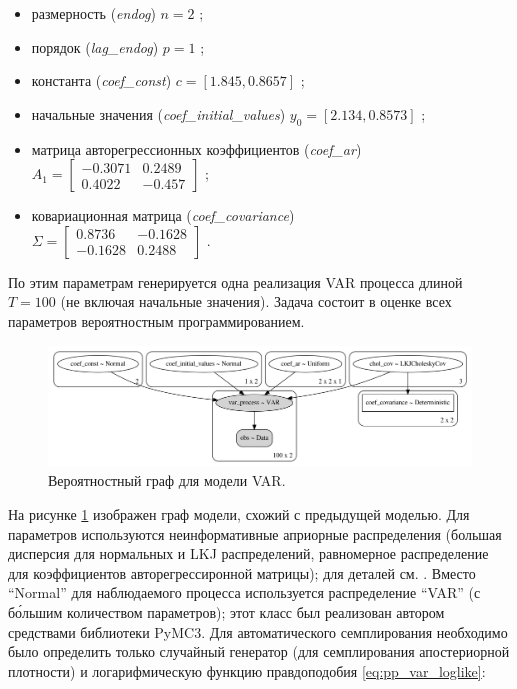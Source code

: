 \documentclass[a4paper,14pt]{extreport}
\begin{document}
\begin{itemize}
	\item размерность (\textit{endog}) $n=2$ ;
	\item порядок (\textit{lag\_endog}) $p=1$ ;
	\item константа (\textit{coef\_const}) $c=[1.845, 0.8657]$ ;
	\item начальные значения (\textit{coef\_initial\_values}) $y_0=[2.134, 0.8573]$ ;
	\item матрица авторегрессионных коэффициентов (\textit{coef\_ar}) \\ $ A_1 = \begin{bmatrix} -0.3071 & 0.2489 \\ 0.4022 & -0.457 \end{bmatrix} $ ;
	\item ковариационная матрица (\textit{coef\_covariance}) \\ $ \Sigma = \begin{bmatrix} 0.8736 & -0.1628 \\ -0.1628 & 0.2488 \end{bmatrix} $ .
\end{itemize}

По этим параметрам генерируется одна реализация VAR процесса длиной $T=100$ (не включая начальные значения). Задача состоит в оценке всех параметров вероятностным программированием.

\begin{figure}[H]
	\includegraphics[width=\linewidth]{img/gen/pp_var_graph.png}
	\caption{Вероятностный граф для модели VAR. }
	\label{fig:pp_var_graph}
\end{figure}

На рисунке \ref{fig:pp_var_graph} изображен граф модели, схожий с предыдущей моделью. Для параметров используются неинформативные априорные распределения (большая дисперсия для нормальных и LKJ распределений, равномерное распределение для коэффициентов авторегрессиронной матрицы); для деталей см. . Вместо ``Normal'' для наблюдаемого процесса используется распределение ``VAR'' (с б\'{о}льшим количеством параметров); этот класс был реализован автором средствами библиотеки PyMC3. Для автоматического семплирования необходимо было определить только случайный генератор (для семплирования апостериорной плотности) и логарифмическую функцию правдоподобия \eqref{eq:pp_var_loglike}:
\end{document}
